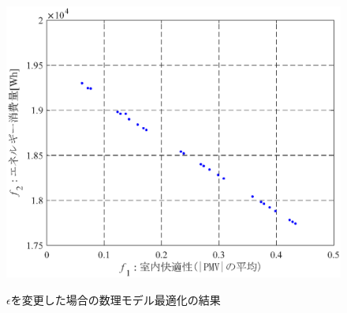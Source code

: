 \begin{figure}[htbp]
\begin{center}
\begin{minipage}{0.6\textwidth}
\begin{center}
      \end{center}
    \end{minipage}
    \begin{minipage}{0.6\textwidth}
      \begin{center}
        \includegraphics[width=1.0\textwidth,keepaspectratio=true]{fig/math_result_pareto_eps3.eps}\\
      \end{center}
    \end{minipage}
  \end{center}
  \vspace{2mm}
  \caption{$\epsilon$を変更した場合の数理モデル最適化の結果}
  \label{fig::math_result_pareto_eps}
\end{figure}

